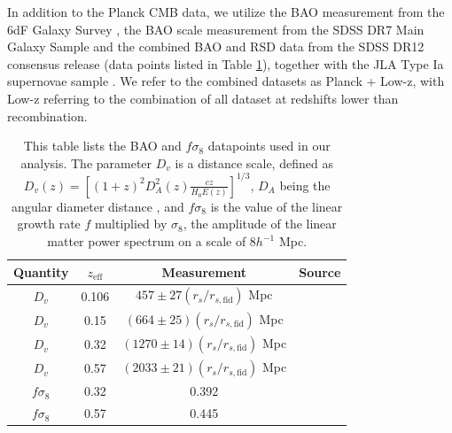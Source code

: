 \documentclass[a4paper,fleqn,usenatbib]{mnras}
\begin{document}
In addition to the Planck CMB data, we utilize the BAO measurement from the 6dF Galaxy Survey \citep{Beutler2011}, the BAO scale measurement from the SDSS DR7 Main Galaxy Sample \citep{Ross2015} and the combined  BAO and RSD data from the SDSS DR12 consensus release \citep{Alam:2016hwk} (data points listed in Table \ref{tab:lowzdata}), together with the JLA Type Ia supernovae sample \citep{Betoule:2014frx}. We refer to the combined datasets as Planck + Low-z, with Low-z referring to the combination of all dataset at redshifts lower than recombination.


\begin{table}
\centering
\begin{tabular}{|c|c|c|c|}
\hline
Quantity  & $z_{\text{eff}}$ & Measurement  & Source \\
\hline
$D_v$ & 0.106 & $457 \pm 27 (r_s / r_{s, \text{fid}})$ Mpc & \cite{Beutler2011} \\
$D_v$ & 0.15 & $ (664 \pm 25) (r_s / r_{s, \text{fid}})$ Mpc & \cite{Ross2015}\\
$D_v$ & 0.32 & $ (1270 \pm 14) (r_s / r_{s, \text{fid}})$ Mpc &\cite{Alam:2016hwk}\\
$D_v$ & 0.57 & $ (2033 \pm 21) (r_s / r_{s, \text{fid}})$ Mpc &\cite{Alam:2016hwk}\\
$f\sigma_8$ & 0.32 & 0.392 &\cite{Alam:2016hwk}\\
$f\sigma_8$ & 0.57 & 0.445 &\cite{Alam:2016hwk}\\
\hline
\hline
\end{tabular}
\caption{This table lists the BAO and $f \sigma_8$ datapoints used in our analysis. The parameter $D_v$ is a distance scale, defined as $D_v(z)= \left[(1+z)^2 D_A^2(z) \frac{cz}{H_0 E(z)}\right]^{1/3}$, $D_A$ being the angular diameter distance \citep{Beutler2011}, and $f \sigma_8$ is the value of the linear growth rate $f$ multiplied by $\sigma_8$, the amplitude of the linear matter power spectrum on a scale of $8 h^{-1}$ Mpc.}\label{tab:lowzdata}
\end{table}
\end{document}
